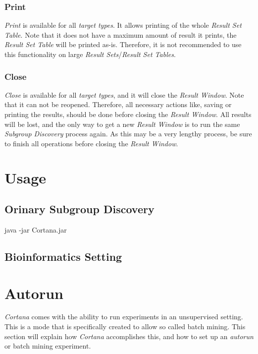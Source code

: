 \documentclass{article}
\begin{document}
\subsubsection{Print}
\label{result-window:print}
\emph{Print} is available for all \emph{target types}.
It allows printing of the whole \emph{Result Set Table}.
Note that it does not have a maximum amount of result it prints, the \emph{Result Set Table} will be printed as-is.
Therefore, it is not recommended to use this functionality on large \emph{Result Sets}/\emph{Result Set Tables}.



\subsubsection{Close}
\label{result-window:close}
\emph{Close} is available for all \emph{target types}, and it will close the \emph{Result Window}.
Note that it can not be reopened.
Therefore, all necessary actions like, saving or printing the results, should be done before closing the \emph{Result Window}.
All results will be lost, and the only way to get a new \emph{Result Window} is to run the same \emph{Subgroup Discovery} process again.
As this may be a very lengthy process, be sure to finish all operations before closing the \emph{Result Window}.





\section{Usage}
\label{section:usage}



\subsection{Orinary Subgroup Discovery}
\label{usage:normal}
java -jar Cortana.jar



\subsection{Bioinformatics Setting}
\label{usage:bioinformatics}





\section{Autorun}
\label{section:auto-run}
\emph{Cortana} comes with the ability to run experiments in an unsupervised setting.
This is a mode that is specifically created to allow so called batch mining.
This section will explain how \emph{Cortana} accomplishes this, and how to set up an \emph{autorun} or batch mining experiment.
\end{document}
